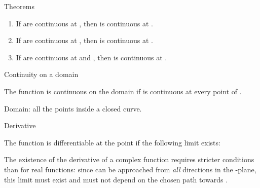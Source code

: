 \EMhold


\begin{EMtheorem}{Theorems}

\begin{enumerate}
\def\labelenumi{\arabic{enumi}.}
\tightlist
\item
  If  are continuous at , then  is continuous at .
\item
  If  are continuous at , then  is continuous at .
\item
  If  are continuous at  and , then  is continuous at .
\end{enumerate}

\end{EMtheorem}

\begin{EMdefinition}{Continuity on a domain}

The function  is continuous on the domain  if  is continuous at every point of .

Domain: all the points inside a closed curve.

\end{EMdefinition}

\begin{EMunit}


\end{EMunit}

\EMhold


\begin{EMdefinition}{Derivative}

The function  is differentiable at the point  if the following limit exists:

\end{EMdefinition}

\begin{EMremark}{}

The existence of the derivative of a complex function requires stricter conditions than for real functions: since  can be approached from \emph{all} directions in the -plane, this limit must exist and must not depend on the chosen path towards .

\end{EMremark}

